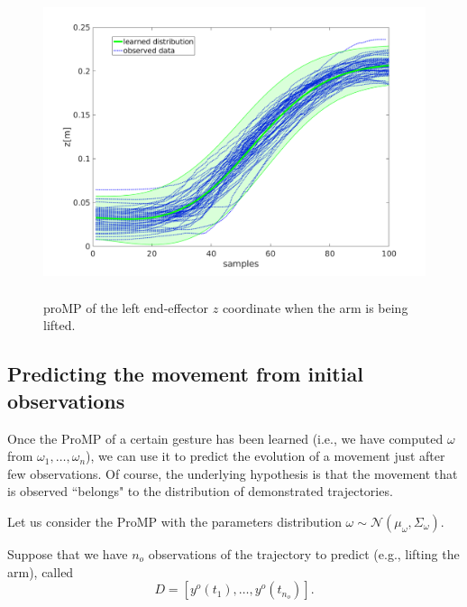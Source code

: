 \begin{figure}[h]
\centering
\includegraphics[height=9cm]{figs/proMPz.pdf}
\caption{proMP of the left end-effector $z$ coordinate when the arm is being lifted.}
\label{fig:proMPlifting}
\end{figure}





\subsection{Predicting the movement from initial observations}

Once the ProMP of a certain gesture has been learned (i.e., we have computed $\omega$ from $\omega_1, \ldots, \omega_n$), we can use it to predict the evolution of a movement just after few observations. Of course, the underlying hypothesis is that the movement that is observed ``belongs" to the distribution of demonstrated trajectories.

Let us consider the ProMP with the parameters distribution $\omega \sim \mathcal{N}(\mu_\omega, \Sigma_\omega)$.  

Suppose that we have $n_o$ observations of the trajectory to predict (e.g., lifting the arm), called 
$$D=[y^o(t_1),\ldots, y^o(t_{n_o})].$$

